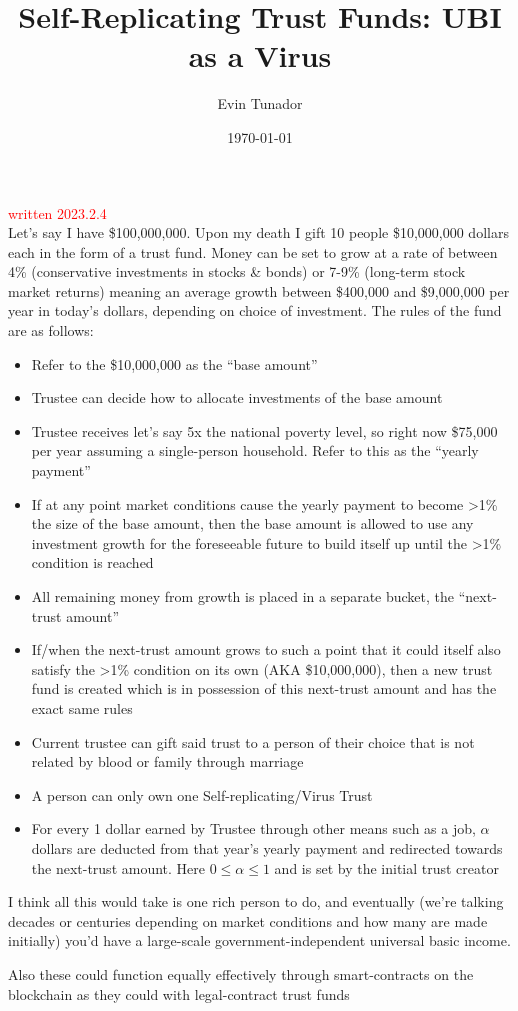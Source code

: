 \documentclass{article}[10pt]
\title{Self-Replicating Trust Funds: UBI as a Virus}
\author{Evin Tunador}
\date{\today}
\begin{document}
\maketitle

\hline
\vspace{0.1in}
\textcolor{red}{written 2023.2.4}\\

Let’s say I have \$100,000,000. 
Upon my death I gift 10 people \$10,000,000 dollars each in the form of a trust fund. 
Money can be set to grow at a rate of between 4\% (conservative investments in stocks & bonds) or 7-9\% (long-term stock market returns) meaning an average growth between \$400,000 and \$9,000,000 per year in today’s dollars, depending on choice of investment. 
The rules of the fund are as follows:

\begin{itemize}
    \item Refer to the \$10,000,000 as the “base amount”
    \item Trustee can decide how to allocate investments of the base amount
    \item Trustee receives let’s say 5x the national poverty level, so right now \$75,000 per year assuming a single-person household. 
    Refer to this as the “yearly payment”
    \item If at any point market conditions cause the yearly payment to become >1\% the size of the base amount, then the base amount is allowed to use any investment growth for the foreseeable future to build itself up until the >1\% condition is reached
    \item All remaining money from growth is placed in a separate bucket, the “next-trust amount”
    \item If/when the next-trust amount grows to such a point that it could itself also satisfy the >1\% condition on its own (AKA \$10,000,000), then a new trust fund is created which is in possession of this next-trust amount and has the exact same rules
    \item Current trustee can gift said trust to a person of their choice that is not related by blood or family through marriage
    \item A person can only own one Self-replicating/Virus Trust
    \item For every 1 dollar earned by Trustee through other means such as a job, $\alpha$ dollars are deducted from that year’s yearly payment and redirected towards the next-trust amount. 
    Here $0 \leq \alpha \leq 1$ and is set by the initial trust creator
\end{itemize}

I think all this would take is one rich person to do, and eventually (we’re talking decades or centuries depending on market conditions and how many are made initially) you’d have a large-scale government-independent universal basic income. \par

Also these could function equally effectively through smart-contracts on the blockchain as they could with legal-contract trust funds

\vspace{0.1in}
\hline
\vspace{0.1in}
\end{document}
